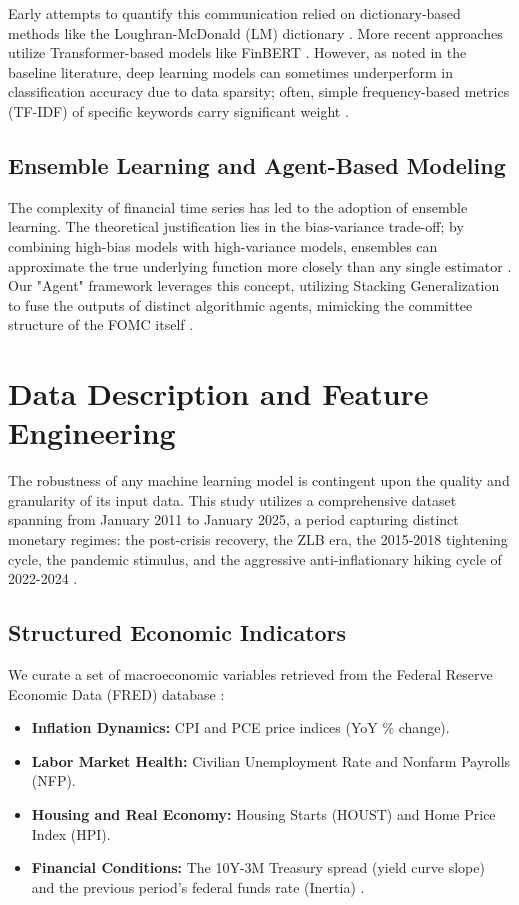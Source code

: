 \documentclass[11pt, a4paper]{article}
\begin{document}
Early attempts to quantify this communication relied on dictionary-based methods like the Loughran-McDonald (LM) dictionary \cite{ref4}. More recent approaches utilize Transformer-based models like FinBERT \cite{ref6a}. However, as noted in the baseline literature, deep learning models can sometimes underperform in classification accuracy due to data sparsity; often, simple frequency-based metrics (TF-IDF) of specific keywords carry significant weight \cite{ref1}.

\subsection{Ensemble Learning and Agent-Based Modeling}
The complexity of financial time series has led to the adoption of ensemble learning. The theoretical justification lies in the bias-variance trade-off; by combining high-bias models with high-variance models, ensembles can approximate the true underlying function more closely than any single estimator \cite{ref8}. Our "Agent" framework leverages this concept, utilizing Stacking Generalization to fuse the outputs of distinct algorithmic agents, mimicking the committee structure of the FOMC itself \cite{ref12, ref8a}.

\section{Data Description and Feature Engineering}
The robustness of any machine learning model is contingent upon the quality and granularity of its input data. This study utilizes a comprehensive dataset spanning from January 2011 to January 2025, a period capturing distinct monetary regimes: the post-crisis recovery, the ZLB era, the 2015-2018 tightening cycle, the pandemic stimulus, and the aggressive anti-inflationary hiking cycle of 2022-2024 \cite{ref1}.

\subsection{Structured Economic Indicators}
We curate a set of macroeconomic variables retrieved from the Federal Reserve Economic Data (FRED) database \cite{ref4a}:
\begin{itemize}
    \item \textbf{Inflation Dynamics:} CPI and PCE price indices (YoY \% change).
    \item \textbf{Labor Market Health:} Civilian Unemployment Rate and Nonfarm Payrolls (NFP).
    \item \textbf{Housing and Real Economy:} Housing Starts (HOUST) and Home Price Index (HPI).
    \item \textbf{Financial Conditions:} The 10Y-3M Treasury spread (yield curve slope) and the previous period's federal funds rate (Inertia) \cite{ref1}.
\end{itemize}
\end{document}
